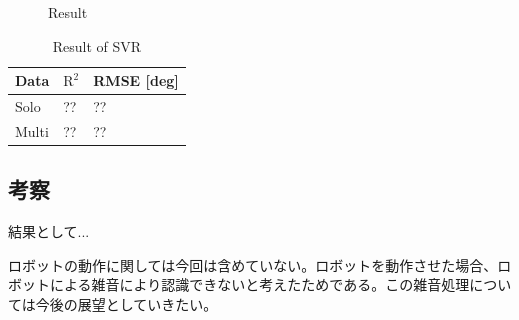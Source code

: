 \begin{figure}[tb]
    \centering
    \label{fig:hand_result_1plate}
    \label{fig:hand_result_2plate}
    \caption{Result}
    \label{fig:hand_result}
\end{figure}

\begin{table}[tb]
\caption{Result of SVR}    
\vspace{1zh}
\centering
  \begin{tabular}{|l|p{6em}|p{6em}|} \hline
    Data & $\mathrm{R}^2$ & RMSE [deg] \\ \hline\hline 
    Solo & ?? &  ?? \\ \hline 
    Multi & ?? &  ?? \\ \hline
  \end{tabular}
  \label{tab:hand_result_svr}
\end{table}

\subsection{考察}
\label{sec:hand_disscusion}
結果として... 

ロボットの動作に関しては今回は含めていない。ロボットを動作させた場合、ロボットによる雑音により認識できないと考えたためである。この雑音処理については今後の展望としていきたい。

\newpage